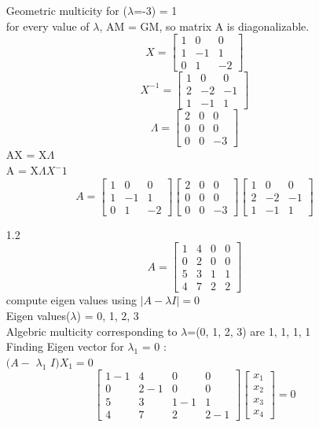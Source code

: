 \documentclass[12pt]{article}
\begin{document}
\begin{enumerate}[label=\alph*)]
Geometric multicity for ($\lambda$=-3) = 1\\
for every value of $\lambda$,  AM = GM,
so matrix A is diagonalizable.
\[
X = \begin{bmatrix} 1 & 0 & 0\\1 & -1 & 1\\0 & 1 & -2\end{bmatrix}
\]
\[
X^{-1} = \begin{bmatrix} 1 & 0 & 0\\2 & -2 & -1\\1 & -1 & 1\end{bmatrix}
\]
\[
\Lambda = \begin{bmatrix} 2 & 0 & 0\\0 & 0 & 0\\0 & 0 & -3\end{bmatrix}
\]
AX = X$\Lambda$\\
A = X$\Lambda$$X^-1$
\[
A = \begin{bmatrix} 1 & 0 & 0\\1 & -1 & 1\\0 & 1 & -2\end{bmatrix}\begin{bmatrix} 2 & 0 & 0\\0 & 0 & 0\\0 & 0 & -3\end{bmatrix}\begin{bmatrix} 1 & 0 & 0\\2 & -2 & -1\\1 & -1 & 1\end{bmatrix}
\]
\newpage
\item[1.2]
\[
A = \begin{bmatrix} 1 & 4 & 0 & 0\\0 & 2 & 0 & 0\\5 & 3 & 1 & 1\\4 & 7 & 2 & 2\end{bmatrix}
\]
compute eigen values using $|A - $$\lambda$$I| = 0$\\
Eigen values($\lambda$) = 0, 1, 2, 3\\
Algebric multicity corresponding to $\lambda$=(0, 1, 2, 3) are 1, 1, 1, 1\\
Finding Eigen vector for $\lambda_{1}$ = 0 :\\
$(A-$ $\lambda_{1}$ $I)X_{1} = 0$
\[
\begin{bmatrix} 1-1 & 4 & 0 & 0\\0 & 2-1 & 0 & 0\\5 & 3 & 1-1 & 1\\4 & 7 & 2 & 2-1\end{bmatrix}\begin{bmatrix} x_{1}\\x_{2}\\x_{3}\\x_{4}\end{bmatrix} = 0
\]$$
\end{enumerate}
\end{document}
